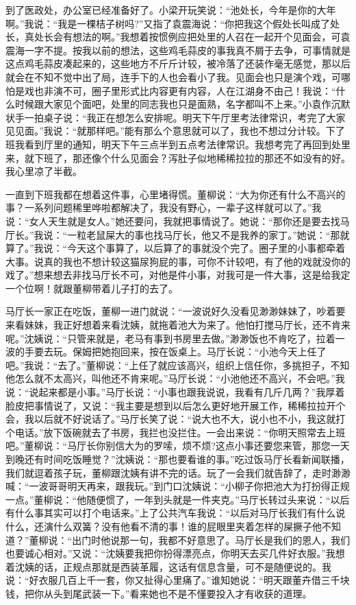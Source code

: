 \documentclass[12pt,oneside]{book}
\begin{document}
到了医政处，办公室已经准备好了。小梁开玩笑说：``池处长，今年是你的大年啊。''我说：``我是一棵桔子树吗?''又指了袁震海说：``你把我这个假处长叫成了处长，真处长会有想法的啊。''我想着按惯例应把处里的人召在一起开个见面会，可袁震海一字不提。按我以前的想法，这些鸡毛蒜皮的事我真不屑于去争，可事情就是这点鸡毛蒜皮凑起来的，这些地方不斤斤计较，被冷落了还装作毫无感觉，那以后就会在不知不觉中出了局，连手下的人也会看小了我。见面会也只是演个戏，可哪怕是戏也非演不可，圈子里形式比内容更有内容，人在江湖身不由己！我说：``什么时候跟大家见个面吧，处里的同志我也只是面熟，名字都叫不上来。''小袁作沉默状手一拍桌子说：``我正在想怎么安排呢。明天下午厅里考法律常识，考完了大家见见面。''我说：``就那样吧。''能有那么个意思就可以了，我也不想过分计较。下了班我看到厅里的通知，明天下午三点半到五点考法律常识。我想考完了再回到处里来，就下班了，那还像个什么见面会？泻肚子似地稀稀拉拉的那还不如没有的好。我心里凉了半截。

一直到下班我都在想着这件事，心里堵得慌。董柳说：``大为你还有什么不高兴的事？一系列问题稀里哗啦都解决了，我没有野心，一辈子这样就可以了。''我说：``女人天生就是女人。''她还要问，我就把事情说了。她说：``那你还是要去找马厅长。''我说：``一粒老鼠屎大的事也找马厅长，他又不是我养的家丁。''她说：``那就算了。''我说：``今天这个事算了，以后算了的事就没个完了。圈子里的小事都牵着大事。说真的我也不想计较这猫尿狗屁的事，可你不计较吧，有了他的戏就没你的戏了。''想来想去非找马厅长不可，对他是件小事，对我可是一件大事，这是给我定一个位啊！就跟董柳带着儿子打的去了。

马厅长一家正在吃饭，董柳一进门就说：``一波说好久没看见渺渺妹妹了，吵着要来看妹妹，我正好想着来看沈姨，就拖着池大为来了。他怕打搅马厅长，还不肯来呢。''沈姨说：``只管来就是，老马有事到书房里去做。''渺渺饭也不肯吃了，拉着一波的手要去玩。保姆把她抱回来，按在饭桌上。马厅长说：``小池今天上任了吧。''我说：``去了。''董柳说：``上任了就应该高兴，组织上信任你，多挑担子，不知他怎么就不太高兴，叫他还不肯来呢。''马厅长说：``小池他还不高兴，不会吧。''我说：``说起来都是小事。''马厅长说：``小事也跟我说说，我看有几斤几两？''我厚着脸皮把事情说了，又说：``我主要是想到以后怎么更好地开展工作，稀稀拉拉开个会，我以后就不好说话了。''马厅长笑了说：``说大也不大，说小也不小，我这就打个电话。''放下饭碗就去了书房，我拦也没拦住。一会出来说：``你明天照常去上班吧。''董柳说：``马厅长你别信大为的罗嗦，烦不烦?这点小事还要您来管，那您一天到晚还有时间吃饭睡觉？''沈姨说：``那也要看谁的事。''吃过饭马厅长看新闻联播，我们就逗着孩子玩，董柳跟沈姨有讲不完的话。玩了一会我们就告辞了，走时渺渺喊：``一波哥哥明天再来，跟我玩。''到门口沈姨说：``小柳子你把池大为打扮得正规一点。''董柳说：``他随便惯了，一年到头就是一件夹克。''马厅长转过头来说：``以后有什么事其实可以打个电话来。''上了公共汽车我说：``以后对马厅长我们有什么说什么，还演什么双簧？没有他看不清的事！谁的屁眼里夹着怎样的屎撅子他不知道？''董柳说：``出门时他说那一句，我都不好意思了。马厅长是我们的恩人，我们也要诚心相对。''又说：``沈姨要我把你扮得漂亮点，你明天去买几件好衣服。''我想着沈姨的话，正规点那就是西装革履，这话有信息含量，可不是随便说的。我说：``好衣服几百上千一套，你又扯得心里痛了。''谁知她说：``明天跟董卉借三千块钱，把你从头到尾武装一下。''看来她也不是不懂要投入才有收获的道理。
\end{document}
